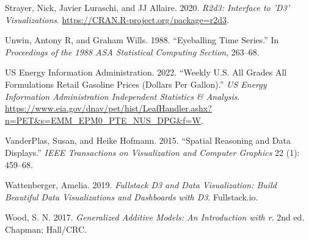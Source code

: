 \documentclass[
]{jds}
\newlength{\cslhangindent}
\newlength{\cslentryspacingunit} %
\newenvironment{CSLReferences}[2] %
 {%
  \setlength{\parindent}{0pt}
  \ifodd #1
  \let\oldpar\par
  \def\par{\hangindent=\cslhangindent\oldpar}
  \fi
  \setlength{\parskip}{#2\cslentryspacingunit}
 }%
 {}
\begin{document}
\begin{CSLReferences}{1}{0}
\leavevmode{}%
Strayer, Nick, Javier Luraschi, and JJ Allaire. 2020. \emph{R2d3:
Interface to 'D3' Visualizations}.
\url{https://CRAN.R-project.org/package=r2d3}.

\leavevmode{}%
Unwin, Antony R, and Graham Wills. 1988. {``Eyeballing Time Series.''}
In \emph{Proceedings of the 1988 ASA Statistical Computing Section},
263--68.

\leavevmode{}%
US Energy Information Administration. 2022. {``Weekly {U}.{S}. {All}
{Grades} {All} {Formulations} {Retail} {Gasoline} {Prices} ({Dollars}
Per {Gallon}).''} \emph{US Energy Information Administration Independent
Statistics \& Analysis}.
\url{https://www.eia.gov/dnav/pet/hist/LeafHandler.ashx?n=PET\&s=EMM_EPM0_PTE_NUS_DPG\&f=W}.

\leavevmode{}%
VanderPlas, Susan, and Heike Hofmann. 2015. {``Spatial Reasoning and
Data Displays.''} \emph{IEEE Transactions on Visualization and Computer
Graphics} 22 (1): 459--68.

\leavevmode{}%
Wattenberger, Amelia. 2019. \emph{Fullstack D3 and Data Visualization:
Build Beautiful Data Visualizations and Dashboards with D3}.
Fullstack.io.

\leavevmode{}%
Wood, S. N. 2017. \emph{Generalized Additive Models: An Introduction
with r}. 2nd ed. Chapman; Hall/CRC.

\end{CSLReferences}
\end{document}
